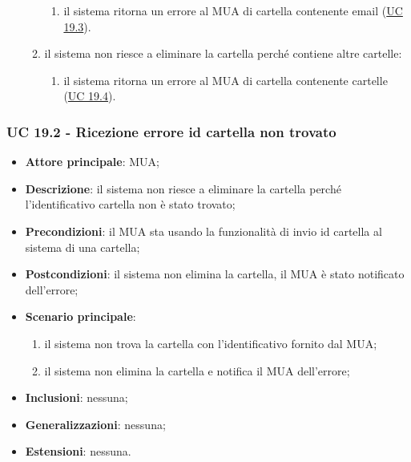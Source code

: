 \begin{itemize}
\begin{enumerate}[label=\alph*.]
\begin{enumerate}[label=\arabic*.]
                    \item il sistema ritorna un errore al MUA di cartella contenente email (\hyperref[sec:UC19.3]{UC 19.3}).
                \end{enumerate}
                \item il sistema non riesce a eliminare la cartella perché contiene altre cartelle:
                \begin{enumerate}[label=\arabic*.]
                    \item il sistema ritorna un errore al MUA di cartella contenente cartelle (\hyperref[sec:UC19.4]{UC 19.4}).
                \end{enumerate}
            \end{enumerate}
    \end{itemize}


\subsubsection{UC 19.2 - Ricezione errore id cartella non trovato} \label{sec:UC19.2}
    \begin{itemize}
        \item \textbf{Attore principale}: MUA;
        \item \textbf{Descrizione}: il sistema non riesce a eliminare la cartella perché l'identificativo cartella non è stato trovato;
        \item \textbf{Precondizioni}: il MUA sta usando la funzionalità di invio id cartella al sistema di una cartella;
        \item \textbf{Postcondizioni}: il sistema non elimina la cartella, il MUA è stato notificato dell'errore;
        \item \textbf{Scenario principale}:
            \begin{enumerate}
                \item il sistema non trova la cartella con l'identificativo fornito dal MUA;
                \item il sistema non elimina la cartella e notifica il MUA dell'errore;
            \end{enumerate}
        \item \textbf{Inclusioni}: nessuna;
        \item \textbf{Generalizzazioni}: nessuna;
        \item \textbf{Estensioni}: nessuna.
    \end{itemize}
   
